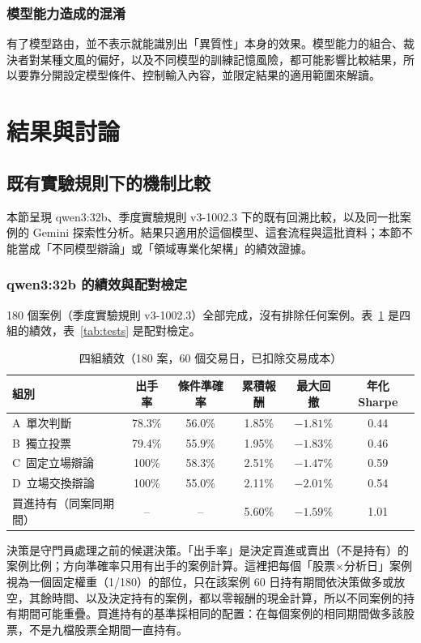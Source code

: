 \documentclass[12pt,a4paper]{article}
\numberwithin{table}{section}
\numberwithin{figure}{section}
\newcommand{\grp}[1]{\textsf{#1}}
\begin{document}
\subsubsection{模型能力造成的混淆}
有了模型路由，並不表示就能識別出「異質性」本身的效果。模型能力的組合、裁決者對某種文風的偏好，以及不同模型的訓練記憶風險，都可能影響比較結果，所以要靠分開設定模型條件、控制輸入內容，並限定結果的適用範圍來解讀。

\clearpage\section{結果與討論}
\subsection{既有實驗規則下的機制比較}
本節呈現 qwen3:32b、季度實驗規則 v3-1002.3 下的既有回溯比較，以及同一批案例的 Gemini 探索性分析。結果只適用於這個模型、這套流程與這批資料；本節不能當成「不同模型辯論」或「領域專業化架構」的績效證據。


\subsubsection{qwen3:32b 的績效與配對檢定}
180 個案例（季度實驗規則 v3-1002.3）全部完成，沒有排除任何案例。表~\ref{tab:main} 是四組的績效，表~\ref{tab:tests} 是配對檢定。

\begin{table}[H]
\centering\small
\caption{四組績效（180 案，60 個交易日，已扣除交易成本）}
\label{tab:main}
\setlength{\tabcolsep}{5pt}
\begin{tabular}{@{}lccccc@{}}
\toprule
組別 & 出手率 & 條件準確率 & 累積報酬 & 最大回撤 & 年化 Sharpe \\
\midrule
\grp{A}\ 單次判斷 & 78.3\% & 56.0\% & 1.85\% & $-1.81\%$ & 0.44 \\
\grp{B}\ 獨立投票 & 79.4\% & 55.9\% & 1.95\% & $-1.83\%$ & 0.46 \\
\grp{C}\ 固定立場辯論 & 100\% & 58.3\% & 2.51\% & $-1.47\%$ & 0.59 \\
\grp{D}\ 立場交換辯論 & 100\% & 55.0\% & 2.11\% & $-2.01\%$ & 0.54 \\
\midrule
買進持有（同案同期間） & -- & -- & 5.60\% & $-1.59\%$ & 1.01 \\
\bottomrule
\end{tabular}
\par\smallskip
\raggedright\footnotesize 決策是守門員處理之前的候選決策。「出手率」是決定買進或賣出（不是持有）的案例比例；方向準確率只用有出手的案例計算。這裡把每個「股票×分析日」案例視為一個固定權重（1/180）的部位，只在該案例 60 日持有期間依決策做多或放空，其餘時間、以及決定持有的案例，都以零報酬的現金計算，所以不同案例的持有期間可能重疊。買進持有的基準採相同的配置：在每個案例的相同期間做多該股票，不是九檔股票全期間一直持有。
\end{table}
\end{document}
